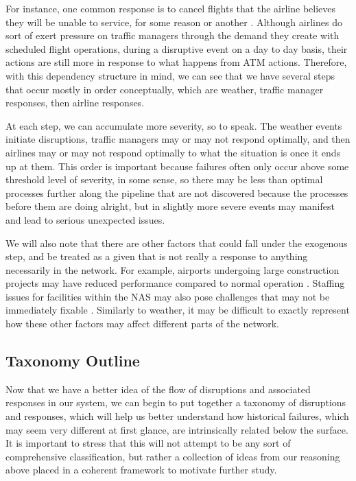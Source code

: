 For instance, one common response is to cancel flights that the airline believes they will be unable to service, for some reason or another \cite{bts_causes_2024}. Although airlines do sort of exert pressure on traffic managers through the demand they create with scheduled flight operations, during a disruptive event on a day to day basis, their actions are still more in response to what happens from ATM actions. Therefore, with this dependency structure in mind, we can see that we have several steps that occur mostly in order conceptually, which are weather, traffic manager responses, then airline responses. 

At each step, we can accumulate more severity, so to speak. The weather events initiate disruptions, traffic managers may or may not respond optimally, and then airlines may or may not respond optimally to what the situation is once it ends up at them. This order is important because failures often only occur above some threshold level of severity, in some sense, so there may be less than optimal processes further along the pipeline that are not discovered because the processes before them are doing alright, but in slightly more severe events may manifest and lead to serious unexpected issues. 

We will also note that there are other factors that could fall under the exogenous step, and be treated as a given that is not really a response to anything necessarily in the network. For example, airports undergoing large construction projects may have reduced performance compared to normal operation \cite{faa_construction_2025}. Staffing issues for facilities within the NAS may also pose challenges that may not be immediately fixable \cite{faa_newark_staffing_2025}. Similarly to weather, it may be difficult to exactly represent how these other factors may affect different parts of the network. 

\subsection{Taxonomy Outline}

Now that we have a better idea of the flow of disruptions and associated responses in our system, we can begin to put together a taxonomy of disruptions and responses, which will help us better understand how historical failures, which may seem very different at first glance, are intrinsically related below the surface. It is important to stress that this will not attempt to be any sort of comprehensive classification, but rather a collection of ideas from our reasoning above placed in a coherent framework to motivate further study.

